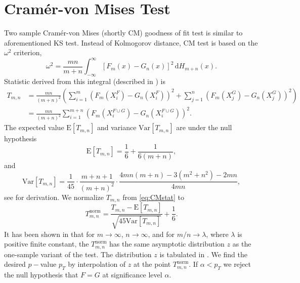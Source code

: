 \section{Cram\'{e}r-von Mises Test}
Two sample Cram\'{e}r-von Mises (shortly CM)  goodness of fit test is similar to aforementioned KS test. Instead of Kolmogorov distance, CM test  is based on the $\omega^2$ criterion,
\begin{equation}
\omega^2 = \frac{mn}{m+n} \int_{-\infty}^\infty \left[F_m(x) - G_n(x) \right]^2 \,\mathrm{d} H_{m+n}(x).
\end{equation} 
Statistic derived from this integral (described in \cite{Anderson1962}) is
\begin{align}
T_{m,n} & = \frac{mn}{(m+n)^2}\left( \sum_{i=1}^m \left( F_m\left(X^F_i\right) - G_n\left(X^F_i\right)\right)^2 + \sum_{j=1}^n \left( F_m\left(X^G_j\right) - G_n\left(X^G_j\right)\right)^2 \right) \\
& = \frac{mn}{(m+n)^2} \sum_{i=1}^{m+n} \left( F_m\left(X^{F\cup G}_i\right) - G_n\left(X^{F\cup G}_i\right)\right)^2 .
\label{eq:CMstat} %
\end{align}
The expected value $\mathrm{E} [T_{m,n}]$ and variance $\mathrm{Var} [T_{m,n}]$ are %
under the null hypothesis 
\begin{equation}
\mathrm{E} [T_{m,n}] = \frac{1}{6} + \frac{1}{6(m+n)},
\end{equation}
and
\begin{equation}
\mathrm{Var} [T_{m,n}] = \frac{1}{45} \cdot \frac{m+n+1}{(m+n)^2} \cdot \frac{4mn(m+n) - 3(m^2 + n^2)-2mn}{4mn},
\end{equation}
see \cite{Anderson1962} for derivation. We normalize $T_{m,n}$ from \eqref{eq:CMstat} to
\begin{equation}
T_{m,n}^\mathrm{norm} = \frac{T_{m,n}-\mathrm{E}[T_{m,n}]}{\sqrt{45\mathrm{Var}[T_{m,n}]}} + \frac{1}{6}.
\label{eq:CMstat-lim}
\end{equation}
It has been shown in \cite{Rosenblatt1952} that for $m \rightarrow \infty$, $n \rightarrow \infty$, and for ${m}/{n} \rightarrow \lambda$, where $\lambda$ is positive finite constant, the  $T_{m,n}^\mathrm{norm}$ has the same asymptotic distribution $z$ as the one-sample variant of the test. The distribution $z$ is tabulated  in \cite{AndersonDarling1952}. We find the desired $p-$value $p_T$ by interpolation of $z$ at the point $T_{m,n}^\mathrm{norm}$. If $\alpha < p_T$ we reject the null hypothesis that $F = G $ at significance level $\alpha$.

